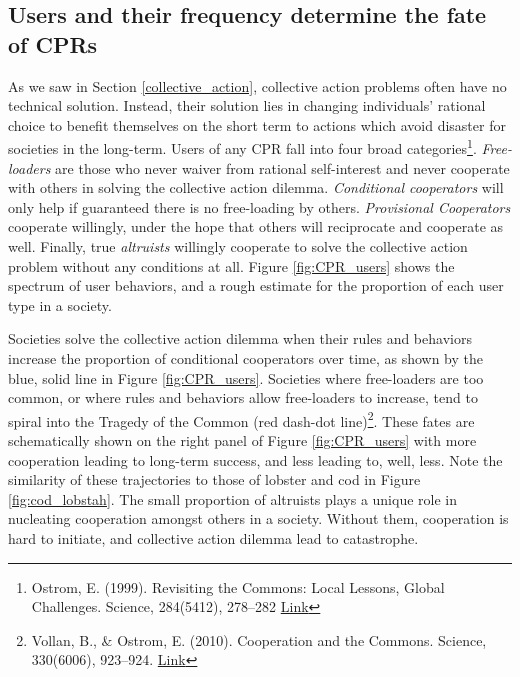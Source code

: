 \documentclass[amstex,12pt]{book}
\begin{document}
\subsection{Users and their frequency determine the fate of CPRs}
As we saw in Section \ref{collective_action}, collective action problems often have no technical solution. Instead, their solution lies in changing individuals' rational choice to benefit themselves on the short term to actions which avoid disaster for societies in the long-term. Users of any CPR fall into four broad categories\footnote{Ostrom, E. (1999). Revisiting the Commons: Local Lessons, Global Challenges. Science, 284(5412), 278–282 \href{https://doi.org/10.1126/science.284.5412.278}{Link}}. \emph{Free-loaders} are those who never waiver from rational self-interest and never cooperate with others in solving the collective action dilemma. \emph{Conditional cooperators} will only help if guaranteed there is no free-loading by others. \emph{Provisional Cooperators} cooperate willingly, under the hope that others will reciprocate and cooperate as well. Finally, true \emph{altruists} willingly cooperate to solve the collective action problem without any conditions at all. Figure \ref{fig:CPR_users} shows the spectrum of user behaviors, and a rough estimate for the proportion of each user type in a society. 

Societies solve the collective action dilemma when their rules and behaviors increase the proportion of conditional cooperators over time, as shown by the blue, solid line in Figure \ref{fig:CPR_users}. Societies where free-loaders are too common, or where rules and behaviors allow free-loaders to increase, tend to spiral into the Tragedy of the Common (red dash-dot line)\footnote{Vollan, B., \& Ostrom, E. (2010). Cooperation and  the Commons. Science, 330(6006), 923–924. \href{https://doi.org/10.1126/science.1198347}{Link}}. These fates are schematically shown on the right panel of Figure \ref{fig:CPR_users} with more cooperation leading to long-term success, and less leading to, well, less. Note the similarity of these trajectories to those of lobster and cod in Figure \ref{fig:cod_lobstah}. The small proportion of altruists plays a unique role in nucleating cooperation amongst others in a society. Without them, cooperation is hard to initiate, and collective action dilemma lead to catastrophe.  
\end{document}
